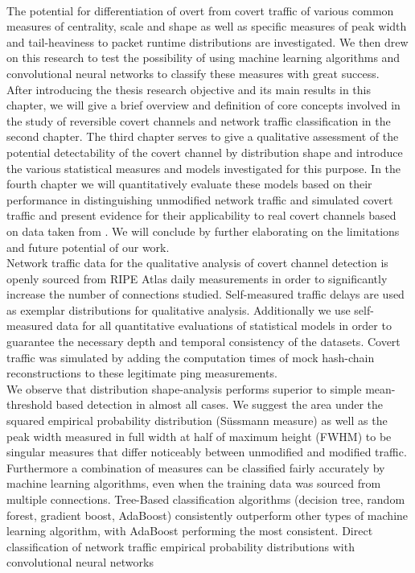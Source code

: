 \documentclass[12pt,a4paper,automark, toc=bib]{scrreprt}
\theoremstyle{definition}
\begin{document}
		\\
		The potential for differentiation of overt from covert traffic of various common measures of centrality, scale and shape as well as specific measures of peak width and tail-heaviness to packet runtime distributions are investigated. We then drew on this research to test the possibility of using machine learning algorithms and convolutional neural networks to classify these measures with great success.\\
		After introducing the thesis research objective and its main results in this chapter, we will give a brief overview and definition of core concepts involved in the study of reversible covert channels and network traffic classification in the second chapter. The third chapter serves to give a qualitative assessment of the potential detectability of the covert channel by distribution shape and introduce the various statistical measures and models investigated for this purpose. In the fourth chapter we will quantitatively evaluate these models based on their performance in distinguishing unmodified network traffic and simulated covert traffic and present evidence for their applicability to real covert channels based on data taken from  \cite{Schmidbauer}. We will conclude by further elaborating on the limitations and future potential of our work. \\
		Network traffic data for the qualitative analysis of covert channel detection is openly sourced from RIPE Atlas daily measurements in order to significantly increase the number of connections studied. Self-measured traffic delays are used as exemplar distributions for qualitative analysis. Additionally we use self-measured data for all quantitative evaluations of statistical models in order to guarantee the necessary depth and temporal consistency of the datasets. Covert traffic was simulated by adding the computation times of mock hash-chain reconstructions to these legitimate ping measurements. \\
		We observe that distribution shape-analysis performs superior to simple mean-threshold based detection in almost all cases. We suggest the area under the squared empirical probability distribution (Süssmann measure) as well as the peak width measured in full width at half of maximum height (FWHM) to be singular measures that differ noticeably between unmodified and modified traffic. Furthermore a combination of measures can be classified fairly accurately by machine learning algorithms, even when the training data was sourced from multiple connections. Tree-Based classification algorithms (decision tree, random forest, gradient boost, AdaBoost) consistently outperform other types of machine learning algorithm, with AdaBoost performing the most consistent. Direct classification of network traffic empirical probability distributions with convolutional neural networks 
\end{document}
